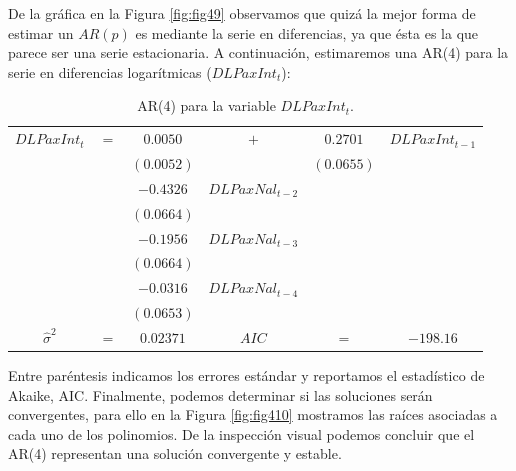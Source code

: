 \documentclass[
]{book}
\begin{document}
De la gráfica en la Figura \ref{fig:fig49} observamos que quizá la mejor forma de estimar un \(AR(p)\) es mediante la serie en diferencias, ya que ésta es la que parece ser una serie estacionaria. A continuación, estimaremos una AR(4) para la serie en diferencias logarítmicas (\(DLPaxInt_t\)):

\begin{longtable}[]{@{}cccccc@{}}
\caption{\label{tab:AR04} AR(4) para la variable \(DLPaxInt_t\).}\tabularnewline
\toprule\noalign{}
\endfirsthead
\endhead
\bottomrule\noalign{}
\endlastfoot
\(DLPaxInt_t\) & \(=\) & \(0.0050\) & \(+\) & \(0.2701\) & \(DLPaxInt_{t-1}\) \\
& & \((0.0052)\) & & \((0.0655)\) & \\
& & \(-0.4326\) & \(DLPaxNal_{t-2}\) & & \\
& & \((0.0664)\) & & & \\
& & \(-0.1956\) & \(DLPaxNal_{t-3}\) & & \\
& & \((0.0664)\) & & & \\
& & \(-0.0316\) & \(DLPaxNal_{t-4}\) & & \\
& & \((0.0653)\) & & & \\
\(\hat{\sigma}^2\) & \(=\) & \(0.02371\) & \(AIC\) & \(=\) & \(-198.16\) \\
\end{longtable}

Entre paréntesis indicamos los errores estándar y reportamos el estadístico de Akaike, AIC. Finalmente, podemos determinar si las soluciones serán convergentes, para ello en la Figura \ref{fig:fig410} mostramos las raíces asociadas a cada uno de los polinomios. De la inspección visual podemos concluir que el AR(4) representan una solución convergente y estable.
\end{document}
